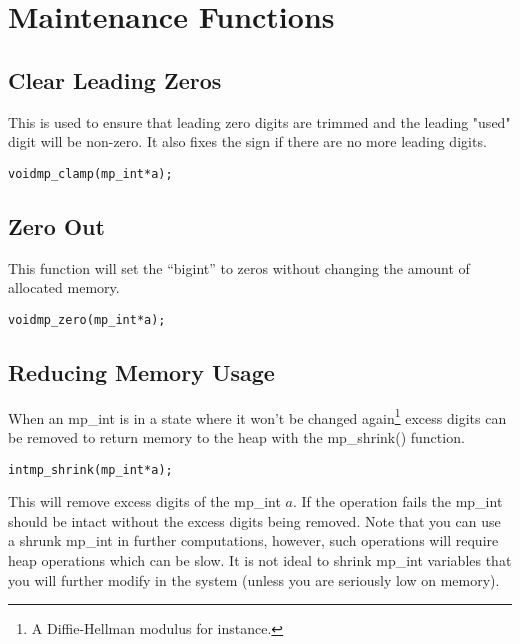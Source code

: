 \documentclass[synpaper]{book}
\begin{document}
\section{Maintenance Functions}
\subsection{Clear Leading Zeros}

This is used to ensure that leading zero digits are trimmed and the leading "used" digit will be non-zero.
It also fixes the sign if there are no more leading digits.

\begin{alltt}
void mp_clamp(mp_int *a);
\end{alltt}

\subsection{Zero Out}

This function will set the ``bigint'' to zeros without changing the amount of allocated memory.

\begin{alltt}
void mp_zero(mp_int *a);
\end{alltt}


\subsection{Reducing Memory Usage}
When an mp\_int is in a state where it won't be changed again\footnote{A Diffie-Hellman modulus for instance.} excess
digits can be removed to return memory to the heap with the mp\_shrink() function.

\begin{alltt}
int mp_shrink (mp_int * a);
\end{alltt}

This will remove excess digits of the mp\_int $a$.  If the operation fails the mp\_int should be intact without the
excess digits being removed.  Note that you can use a shrunk mp\_int in further computations, however, such operations
will require heap operations which can be slow.  It is not ideal to shrink mp\_int variables that you will further
modify in the system (unless you are seriously low on memory).
\end{document}
